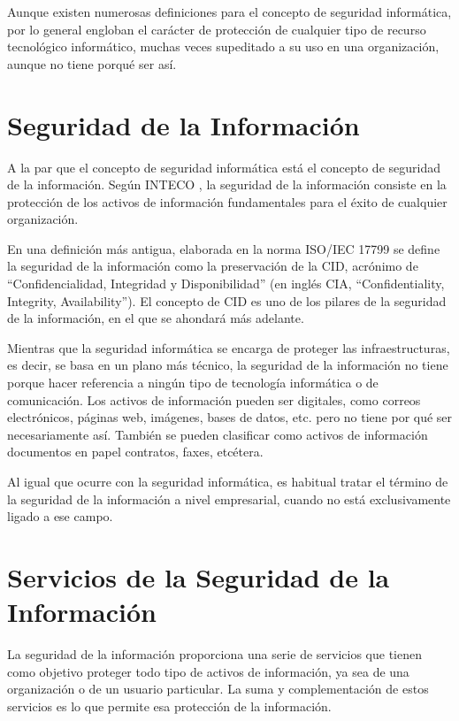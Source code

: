 Aunque existen numerosas definiciones para el concepto de seguridad informática, por lo general engloban el carácter de protección de cualquier tipo de recurso tecnológico informático, muchas veces supeditado a su uso en una organización, aunque no tiene porqué ser así.


\section{Seguridad de la Información}

A la par que el concepto de seguridad informática está el concepto de seguridad de la información. Según INTECO \cite{inteco-defs}, la seguridad de la información consiste en la protección de los activos de información fundamentales para el éxito de cualquier organización.

En una definición más antigua, elaborada en la norma ISO/IEC 17799 \cite{iso-17799} se define la seguridad de la información como la preservación de la CID, acrónimo de “Confidencialidad, Integridad y Disponibilidad” (en inglés CIA, “Confidentiality, Integrity, Availability”). El concepto de CID es uno de los pilares de la seguridad de la información, en el que se ahondará más adelante.

Mientras que la seguridad informática se encarga de proteger las infraestructuras, es decir, se basa en un plano más técnico, la seguridad de la información no tiene porque hacer referencia a ningún tipo de tecnología informática o de comunicación. Los activos de información pueden ser digitales, como correos electrónicos, páginas web, imágenes, bases de datos, etc. pero no  tiene por qué ser necesariamente así. También se pueden clasificar como activos de información documentos en papel contratos, faxes, etcétera.

Al igual que ocurre con la seguridad informática, es habitual tratar el término de la seguridad de la información a nivel empresarial, cuando no está exclusivamente ligado a ese campo.


\section{Servicios de la Seguridad de la Información}
La seguridad de la información proporciona una serie de servicios que tienen como objetivo proteger todo tipo de activos de información, ya sea de una organización o de un usuario particular. La suma y complementación de estos servicios es lo que permite esa protección de la información.

